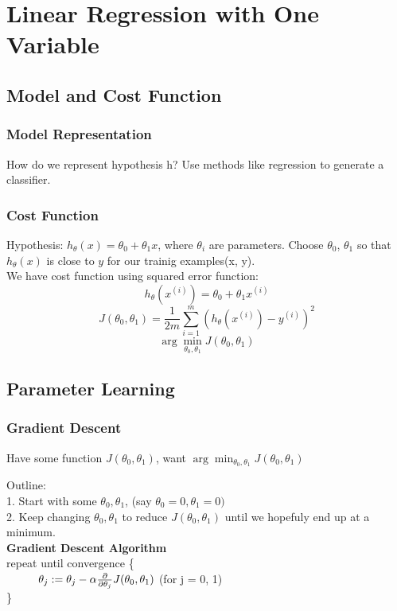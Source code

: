 \documentclass{article}
\newcommand\tab[1][1cm]{\hspace*{#1}}
\begin{document}
\section{Linear Regression with One Variable}
\subsection{Model and Cost Function}
\subsubsection{Model Representation}
How do we represent hypothesis h? Use methods like regression to generate a classifier.
\subsubsection{Cost Function}
Hypothesis: $h_\theta(x) = \theta_0 + \theta_1 x$, where $\theta_i$ are parameters.
Choose $\theta_0$, $\theta_1$ so that $h_\theta(x)$ is close to $y$ for our trainig examples(x, y). \\

We have cost function using squared error function: 
$$h_\theta(x^{(i)}) = \theta_0 + \theta_1 x^{(i)}$$
$$J(\theta_0, \theta_1) = \frac{1}{2m} \sum_{i=1}^{m}(h_\theta(x^{(i)}) - y^{(i)})^2$$
$$\arg\min_{\theta_0, \theta_1}J(\theta_0, \theta_1) $$

\subsection{Parameter Learning}
\subsubsection{Gradient Descent}
Have some function $J(\theta_0, \theta_1)$, want $\arg\min_{\theta_0, \theta_1}J(\theta_0, \theta_1)$

Outline: \\

1. Start with some $\theta_0, \theta_1$, (say $\theta_0 = 0, \theta_1 = 0)$ \\
2. Keep changing $\theta_0, \theta_1$ to reduce $J(\theta_0, \theta_1)$ until we hopefuly end up at a minimum. \\

\textbf{Gradient Descent Algorithm}\\
repeat until convergence \{\\
$\tab \theta_j := \theta_j - \alpha \frac{\partial}{\partial \theta_j}J(\theta_0, \theta_1) $ (for j = 0, 1)\\
\}
\end{document}

